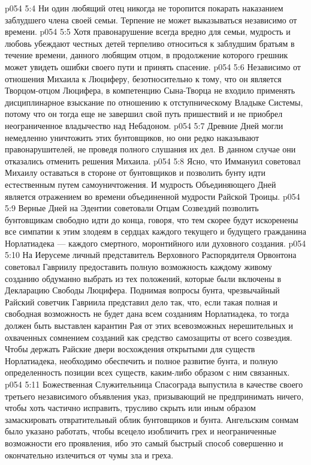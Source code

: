 \vs p054 5:4 \bibnobreakspace Ни один любящий отец никогда не торопится покарать наказанием заблудшего члена своей семьи. Терпение не может выказываться независимо от времени.
\vs p054 5:5 \bibnobreakspace Хотя правонарушение всегда вредно для семьи, мудрость и любовь убеждают честных детей терпеливо относиться к заблудшим братьям в течение времени, данного любящим отцом, в продолжение которого грешник может увидеть ошибки своего пути и принять спасение.
\vs p054 5:6 \bibnobreakspace Независимо от отношения Михаила к Люциферу, безотносительно к тому, что он является Творцом\hyp{}отцом Люцифера, в компетенцию Сына\hyp{}Творца не входило применять дисциплинарное взыскание по отношению к отступническому Владыке Системы, потому что он тогда еще не завершил свой путь пришествий и не приобрел неограниченное владычество над Небадоном.
\vs p054 5:7 \bibnobreakspace Древние Дней могли немедленно уничтожить этих бунтовщиков, но они редко наказывают правонарушителей, не проведя полного слушания их дел. В данном случае они отказались отменить решения Михаила.
\vs p054 5:8 \bibnobreakspace Ясно, что Иммануил советовал Михаилу оставаться в стороне от бунтовщиков и позволить бунту идти естественным путем самоуничтожения. И мудрость Объединяющего Дней является отражением во времени объединенной мудрости Райской Троицы.
\vs p054 5:9 \bibnobreakspace Верные Дней на Эдентии советовали Отцам Созвездий позволить бунтовщикам свободно идти до конца, говоря, что тем скорее будут искоренены все симпатии к этим злодеям в сердцах каждого текущего и будущего гражданина Норлатиадека --- каждого смертного, моронтийного или духовного создания.
\vs p054 5:10 \bibnobreakspace На Иерусеме личный представитель Верховного Распорядителя Орвонтона советовал Гавриилу предоставить полную возможность каждому живому созданию обдуманно выбрать из тех положений, которые были включены в Декларацию Свободы Люцифера. Поднимая вопросы бунта, чрезвычайный Райский советчик Гавриила представил дело так, что, если такая полная и свободная возможность не будет дана всем созданиям Норлатиадека, то тогда должен быть выставлен карантин Рая от этих всевозможных нерешительных и охваченных сомнением созданий как средство самозащиты от всего созвездия. Чтобы держать Райские двери восхождения открытыми для существ Норлатиадека, необходимо обеспечить и полное развитие бунта, и полную определенность позиции всех существ, каким\hyp{}либо образом с ним связанных.
\vs p054 5:11 \bibnobreakspace Божественная Служительница Спасограда выпустила в качестве своего третьего независимого объявления указ, призывающий не предпринимать ничего, чтобы хоть частично исправить, трусливо скрыть или иным образом замаскировать отвратительный облик бунтовщиков и бунта. Ангельским сонмам было указано работать, чтобы всецело изобличить грех и неограниченные возможности его проявления, ибо это самый быстрый способ совершенно и окончательно излечиться от чумы зла и греха.
